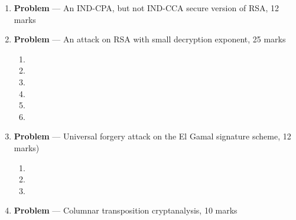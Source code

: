\documentclass[11pt]{article}
\theoremstyle{definition}
\newcounter{problem}
\begin{document}
\begin{enumerate}
\newpage


\item[] \textbf{Problem \theproblem} --- An IND-CPA, but not IND-CCA secure version of RSA, 12
    marks

\newpage

\item[]  \textbf{Problem \theproblem} --- An attack on RSA with small decryption exponent, 25
    marks

\begin{enumerate}

\item %

\item %

\item %

\item %

\item %

\item %

\end{enumerate}

\newpage

\item[] \textbf{Problem \theproblem} --- Universal forgery attack on the El Gamal signature
    scheme, 12 marks)

\begin{enumerate}

\item %

\item %

\item %

\end{enumerate}

\newpage

 

\item[] \textbf{Problem \theproblem} --- Columnar transposition cryptanalysis, 10 marks

\end{enumerate}
\end{document}
